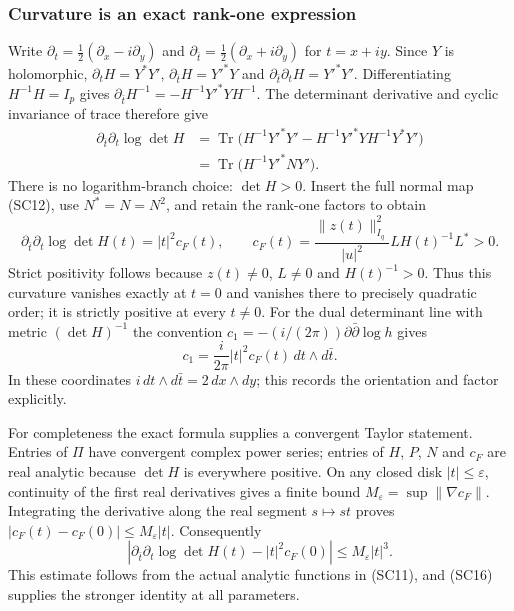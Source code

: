 \subsubsection{Curvature is an exact rank-one expression}

Write $\partial_t=\tfrac12(\partial_x-i\partial_y)$ and
$\partial_{\bar t}=\tfrac12(\partial_x+i\partial_y)$ for $t=x+iy$.
Since $Y$ is holomorphic,
$\partial_tH=Y^*Y'$,
$\partial_{\bar t}H=Y'^*Y$ and
$\partial_{\bar t}\partial_tH=Y'^*Y'$.
Differentiating $H^{-1}H=I_p$ gives
$\partial_{\bar t}H^{-1}=-H^{-1}Y'^*YH^{-1}$.
The determinant derivative and cyclic invariance of trace therefore give
\[
\begin{split}
 \partial_{\bar t}\partial_t\log\det H
 &=\operatorname{Tr}\bigl(H^{-1}Y'^*Y'
   -H^{-1}Y'^*YH^{-1}Y^*Y'\bigr)\\
 &=\operatorname{Tr}\bigl(H^{-1}Y'^*N Y'\bigr).
\end{split}\tag{SC15}
\]
There is no logarithm-branch choice: $\det H>0$.
Insert the full normal map (SC12), use $N^*=N=N^2$, and retain
the rank-one factors to obtain
\[
 \boxed{\partial_{\bar t}\partial_t\log\det H(t)
   =|t|^2 c_F(t),\qquad
 c_F(t)=\frac{\|z(t)\|_{I_q}^2}{|u|^2}
                   L H(t)^{-1}L^*>0.}
 \tag{SC16}
\]
Strict positivity follows because $z(t)\ne0$, $L\ne0$ and
$H(t)^{-1}>0$.  Thus this curvature vanishes exactly at $t=0$
and vanishes there to precisely quadratic order; it is strictly
positive at every $t\ne0$.  For the dual determinant line with metric
$(\det H)^{-1}$ the convention
$c_1=-(i/(2\pi))\partial\bar\partial\log h$ gives
\[
 c_1=\frac i{2\pi}|t|^2c_F(t)\,dt\wedge d\bar t.
 \tag{SC17}
\]
In these coordinates $i\,dt\wedge d\bar t=2\,dx\wedge dy$;
this records the orientation and factor explicitly.

For completeness the exact formula supplies a convergent Taylor
statement.  Entries of $\Pi$ have convergent complex power series;
entries of $H$, $P$, $N$ and $c_F$ are real analytic because
$\det H$ is everywhere positive.  On any closed disk
$|t|\leq\varepsilon$, continuity of the first real derivatives gives
a finite bound $M_\varepsilon=\sup\|\nabla c_F\|$.
Integrating the derivative along the real segment $s\mapsto st$ proves
$|c_F(t)-c_F(0)|\leq M_\varepsilon|t|$.  Consequently
\[
 \left|\partial_{\bar t}\partial_t\log\det H(t)
                  -|t|^2c_F(0)\right|
 \leq M_\varepsilon|t|^3.
 \tag{SC18}
\]
This estimate follows from the actual analytic functions in (SC11),
and (SC16) supplies the stronger identity at all parameters.

